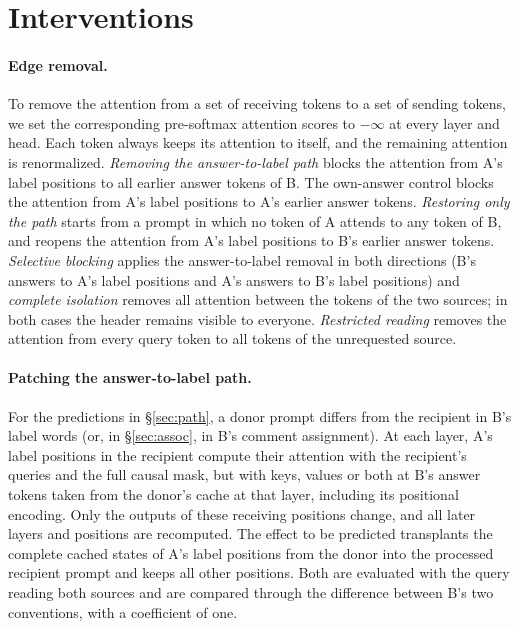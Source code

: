 \section{Interventions}
\label{app:interventions}

\paragraph{Edge removal.}
To remove the attention from a set of receiving tokens to a set of sending tokens, we set the corresponding pre-softmax attention scores to $-\infty$ at every layer and head.
Each token always keeps its attention to itself, and the remaining attention is renormalized.
\emph{Removing the answer-to-label path} blocks the attention from A's label positions to all earlier answer tokens of B.
The own-answer control blocks the attention from A's label positions to A's earlier answer tokens.
\emph{Restoring only the path} starts from a prompt in which no token of A attends to any token of B, and reopens the attention from A's label positions to B's earlier answer tokens.
\emph{Selective blocking} applies the answer-to-label removal in both directions (B's answers to A's label positions and A's answers to B's label positions) and \emph{complete isolation} removes all attention between the tokens of the two sources; in both cases the header remains visible to everyone.
\emph{Restricted reading} removes the attention from every query token to all tokens of the unrequested source.

\paragraph{Patching the answer-to-label path.}
For the predictions in \S\ref{sec:path}, a donor prompt differs from the recipient in B's label words (or, in \S\ref{sec:assoc}, in B's comment assignment).
At each layer, A's label positions in the recipient compute their attention with the recipient's queries and the full causal mask, but with keys, values or both at B's answer tokens taken from the donor's cache at that layer, including its positional encoding.
Only the outputs of these receiving positions change, and all later layers and positions are recomputed.
The effect to be predicted transplants the complete cached states of A's label positions from the donor into the processed recipient prompt and keeps all other positions.
Both are evaluated with the query reading both sources and are compared through the difference between B's two conventions, with a coefficient of one.

